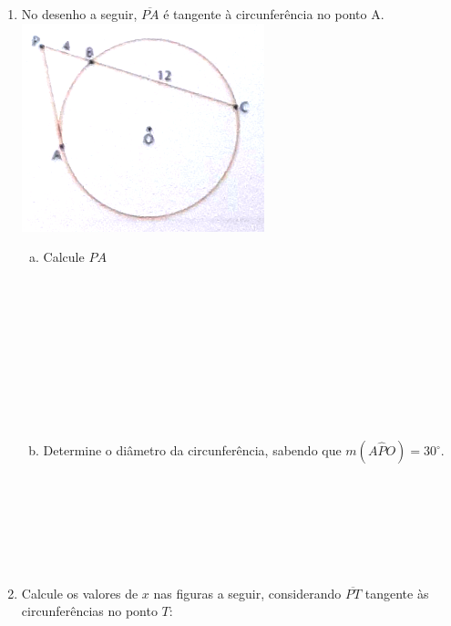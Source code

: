\documentclass[a4paper,14pt]{article}
\begin{document}
\begin{multicols}{2}
\begin{enumerate}
    		\item No desenho a seguir, $\overline{PA}$ é tangente à circunferência no ponto A. \\
    		\includegraphics[width=1\linewidth]{imagens_8FMA110/imagem2}
    		\begin{enumerate}[a)]
    			\item Calcule $PA$ \\\\\\\\\\\\\\\\\\\\
    			\item Determine o diâmetro da circunferência, sabendo que $m(A\hat{P}O) = 30^\circ$.\\\\\\\\\\\\\\
    		\end{enumerate}
    		\item Calcule os valores de $x$ nas figuras a seguir, considerando $\overline{PT}$ tangente às circunferências no ponto $T$: \\

\end{enumerate}
\end{multicols}
\end{document}
